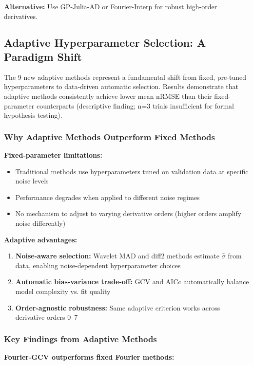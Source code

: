 \textbf{Alternative:} Use GP-Julia-AD or Fourier-Interp for robust high-order derivatives.

\subsection{Adaptive Hyperparameter Selection: A Paradigm Shift}
\label{sec:adaptive_discussion}

The 9 new adaptive methods represent a fundamental shift from fixed, pre-tuned hyperparameters to data-driven automatic selection. Results demonstrate that adaptive methods consistently achieve lower mean nRMSE than their fixed-parameter counterparts (descriptive finding; n=3 trials insufficient for formal hypothesis testing).

\subsubsection{Why Adaptive Methods Outperform Fixed Methods}

\textbf{Fixed-parameter limitations:}
\begin{itemize}
    \item Traditional methods use hyperparameters tuned on validation data at specific noise levels
    \item Performance degrades when applied to different noise regimes
    \item No mechanism to adjust to varying derivative orders (higher orders amplify noise differently)
\end{itemize}

\textbf{Adaptive advantages:}
\begin{enumerate}
    \item \textbf{Noise-aware selection:} Wavelet MAD and diff2 methods estimate $\hat{\sigma}$ from data, enabling noise-dependent hyperparameter choices
    \item \textbf{Automatic bias-variance trade-off:} GCV and AICc automatically balance model complexity vs. fit quality
    \item \textbf{Order-agnostic robustness:} Same adaptive criterion works across derivative orders 0--7
\end{enumerate}

\subsubsection{Key Findings from Adaptive Methods}

\textbf{Fourier-GCV outperforms fixed Fourier methods:}

